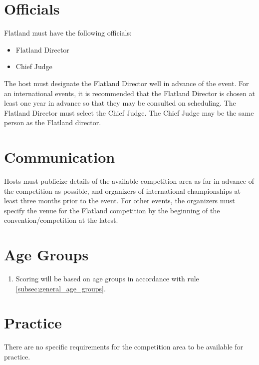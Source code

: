 \section{Officials}

Flatland must have the following officials:
\begin{itemize}
\item Flatland Director
\item Chief Judge
\end{itemize}

The host must designate the Flatland Director well in advance of the event.
For an international events, it is recommended that the Flatland Director is chosen at least one year in advance so that they may be consulted on scheduling.
The Flatland Director must select the Chief Judge.
The Chief Judge may be the same person as the Flatland director.

\section{Communication}

Hosts must publicize details of the available competition area as far in advance of the competition as possible, and organizers of international championships at least three months prior to the event.
For other events, the organizers must specify the venue for the Flatland competition by the beginning of the convention/competition at the latest.

\section{Age Groups}

\begin{enumerate}[leftmargin=1.5em,labelsep=*]
	\item Scoring will be based on age groups in accordance with rule \ref{subsec:general_age_groups}.
\end{enumerate}

\section{Practice}

There are no specific requirements for the competition area to be available for practice.
